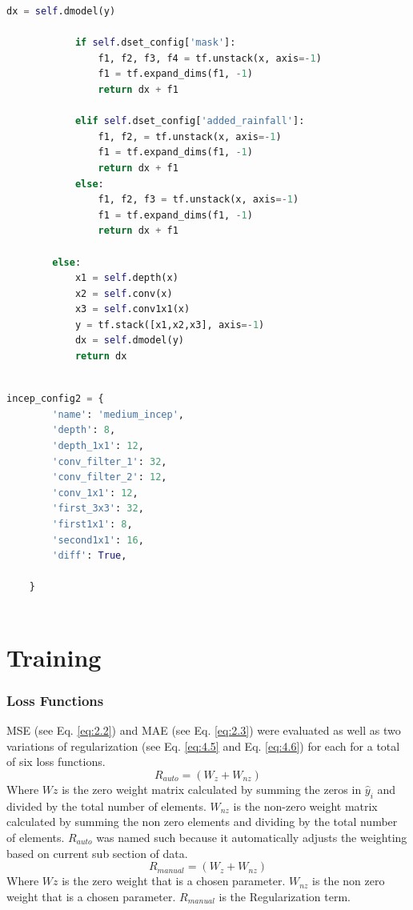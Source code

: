 \begin{lstlisting}[language=Python, label={lst:4}]
			dx = self.dmodel(y)
			
			if self.dset_config['mask']:
				f1, f2, f3, f4 = tf.unstack(x, axis=-1)
				f1 = tf.expand_dims(f1, -1)
				return dx + f1
			
			elif self.dset_config['added_rainfall']:
				f1, f2, = tf.unstack(x, axis=-1)
				f1 = tf.expand_dims(f1, -1)
				return dx + f1
			else:
				f1, f2, f3 = tf.unstack(x, axis=-1)
				f1 = tf.expand_dims(f1, -1)
				return dx + f1
		
		else:
			x1 = self.depth(x)
			x2 = self.conv(x)
			x3 = self.conv1x1(x)
			y = tf.stack([x1,x2,x3], axis=-1)
			dx = self.dmodel(y)
			return dx
	
\end{lstlisting}

\begin{lstlisting}[language=Python, label={lst:5}]
	incep_config2 = {
		'name': 'medium_incep',
		'depth': 8,
		'depth_1x1': 12,
		'conv_filter_1': 32,
		'conv_filter_2': 12,
		'conv_1x1': 12,
		'first_3x3': 32,
		'first1x1': 8,
		'second1x1': 16,
		'diff': True,
		
	}
	
\end{lstlisting}

\section{Training}
\subsubsection*{Loss Functions}
\label{training:loss}
MSE (see Eq. \ref{eq:2.2}) and MAE (see Eq. \ref{eq:2.3}) were evaluated as well as two variations of regularization (see Eq. \ref{eq:4.5} and Eq. \ref{eq:4.6}) for each for a total of six loss functions.
\begin{equation}
	\label{eq:4.5}
	 R_{auto} = (W_{z} + W_{nz})
\end{equation}
Where $W{z}$ is the zero weight matrix calculated by summing the zeros in $\hat{y}_{i}$ and divided by the total number of elements. $W_{nz}$ is the non-zero weight matrix calculated by summing the non zero elements and dividing by the total number of elements. $R_{auto}$ was named such because it automatically adjusts the weighting based on current sub section of data.
\begin{equation}
	\label{eq:4.6}
	R_{manual} = (W_{z} + W_{nz})
\end{equation}
Where $W{z}$ is the zero weight that is a chosen parameter. $W_{nz}$ is the non zero weight that is a chosen parameter. $R_{manual}$ is the Regularization term.

